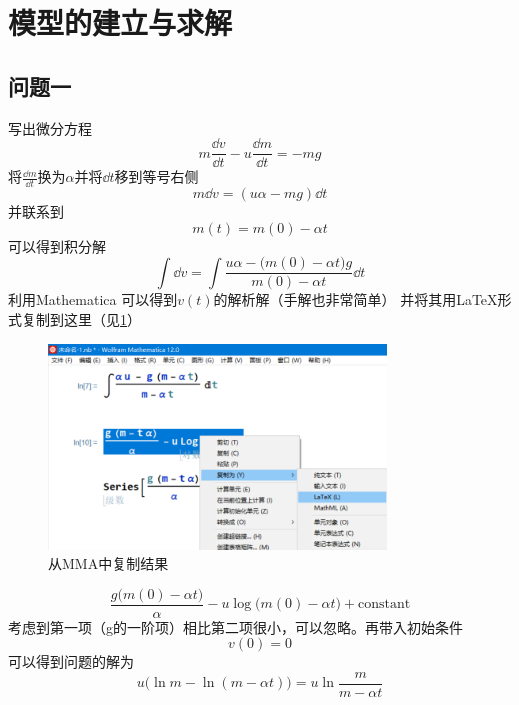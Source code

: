 \documentclass{JXUSTmodeling}
\begin{document}
\section{模型的建立与求解}\label{sec:5}
\subsection{问题一}
写出微分方程
\begin{equation}
    m\frac{\dd v}{\dd t} - u\frac{\dd m}{\dd t} = -m g
\end{equation}
将$\frac{\dd m}{\dd t}$换为$\alpha$并将$\dd t$移到等号右侧
\begin{equation}
    m\dd v  = (u\alpha -m g)\dd t
\end{equation}
并联系到
\begin{equation}
    m(t) = m(0) - \alpha t
\end{equation}
可以得到积分解
\begin{equation}
    \int \dd v = \int \frac{u\alpha - \big(m(0) - \alpha t\big)g}{m(0) - \alpha t} \dd t
\end{equation}
利用Mathematica 可以得到$v(t)$的解析解（手解也非常简单）
并将其用\LaTeX 形式复制到这里（见\ref{fig:show}）
\begin{figure}[htbp]
    \centering
    \includegraphics[width=0.8\textwidth]{figures//lll.png}
    \caption{从MMA中复制结果}\label{fig:show}
\end{figure}
\begin{equation}
    \frac{g \big(m(0)-\alpha  t\big)}{\alpha }-u \log \big(m(0)-\alpha  t\big) + \text{constant}
\end{equation}
考虑到第一项（g的一阶项）相比第二项很小，可以忽略。再带入初始条件
\begin{equation}
    v(0) = 0
\end{equation}
可以得到问题的解为
\begin{equation}
    u\Big(\ln m - \ln (m - \alpha t)\Big) =  u\ln \frac{m}{m - \alpha t}
\end{equation}
\end{document}
